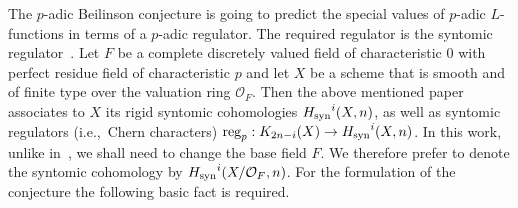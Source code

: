 \documentclass{amsart}
\begin{document}
The {$p$-adic{\futurelet{}}} Beilinson conjecture is going to predict the special
values of {$p$-adic{\futurelet{}}} {$L$-functions{\futurelet{}}} in terms of a {$p$-adic{\futurelet{}}} regulator. The
required regulator is the syntomic regulator~\cite[Theorem~7.5]{Bes98a}. Let $F$
be a complete discretely valued field of characteristic $0$
with perfect residue field of characteristic
$p$ and let $X$ be a scheme that is smooth and of  finite type over 
the valuation ring ${\mathcal O}_F$.  Then the above mentioned paper associates to $X$ its
rigid syntomic cohomologies ${H_{\textup{syn}}}^i(X,n)$, as well as syntomic
regulators (i.e.,\ Chern characters) ${\textup{reg}}_p: K_{2n-i}(X) \to
{H_{\textup{syn}}}^i(X,n)$. In this work, unlike in~\cite{Bes98a}, we shall
need to change the base field $F$. We therefore prefer to denote the
syntomic cohomology by ${H_{\textup{syn}}}^i(X/{\mathcal O}_F,n)$. For the formulation of the
conjecture the following basic fact is required.
\end{document}
